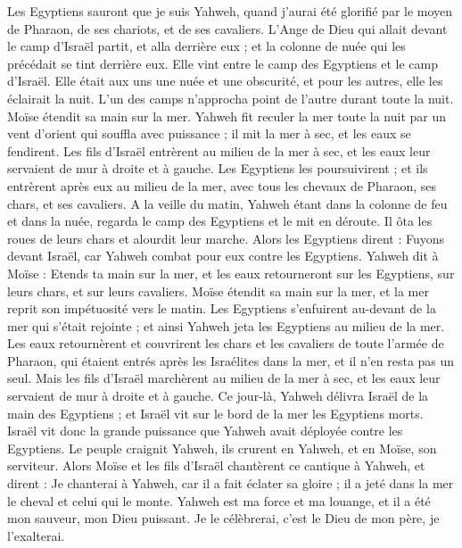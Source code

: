 \begin{multicols}{2}
Les Egyptiens sauront que je suis Yahweh, quand j'aurai été glorifié par le moyen de Pharaon, de ses chariots, et de ses cavaliers.
L'Ange de Dieu qui allait devant le camp d'Israël partit, et alla derrière eux ; et la colonne de nuée qui les précédait se tint derrière eux.
Elle vint entre le camp des Egyptiens et le camp d'Israël. Elle était aux uns une nuée et une obscurité, et pour les autres, elle les éclairait la nuit. L'un des camps n'approcha point de l'autre durant toute la nuit.
Moïse étendit sa main sur la mer. Yahweh fit reculer la mer toute la nuit par un vent d'orient qui souffla avec puissance ; il mit la mer à sec, et les eaux se fendirent.
Les fils d'Israël entrèrent au milieu de la mer à sec, et les eaux leur servaient de mur à droite et à gauche.
Les Egyptiens les poursuivirent ; et ils entrèrent après eux au milieu de la mer, avec tous les chevaux de Pharaon, ses chars, et ses cavaliers.
A la veille du matin, Yahweh étant dans la colonne de feu et dans la nuée, regarda le camp des Egyptiens et le mit en déroute.
Il ôta les roues de leurs chars et alourdit leur marche. Alors les Egyptiens dirent : Fuyons devant Israël, car Yahweh combat pour eux contre les Egyptiens.
Yahweh dit à Moïse : Etends ta main sur la mer, et les eaux retourneront sur les Egyptiens, sur leurs chars, et sur leurs cavaliers.
Moïse étendit sa main sur la mer, et la mer reprit son impétuosité vers le matin. Les Egyptiens s'enfuirent au-devant de la mer qui s'était rejointe ; et ainsi Yahweh jeta les Egyptiens au milieu de la mer.
Les eaux retournèrent et couvrirent les chars et les cavaliers de toute l'armée de Pharaon, qui étaient entrés après les Israélites dans la mer, et il n'en resta pas un seul.
Mais les fils d'Israël marchèrent au milieu de la mer à sec, et les eaux leur servaient de mur à droite et à gauche.
Ce jour-là, Yahweh délivra Israël de la main des Egyptiens ; et Israël vit sur le bord de la mer les Egyptiens morts.
Israël vit donc la grande puissance que Yahweh avait déployée contre les Egyptiens. Le peuple craignit Yahweh, ils crurent en Yahweh, et en Moïse, son serviteur.
\VerseOne{}Alors Moïse et les fils d'Israël chantèrent ce cantique à Yahweh, et dirent : Je chanterai à Yahweh, car il a fait éclater sa gloire ; il a jeté dans la mer le cheval et celui qui le monte.
Yahweh est ma force et ma louange, et il a été mon sauveur, mon Dieu puissant. Je le célèbrerai, c'est le Dieu de mon père, je l'exalterai.

\end{multicols}
